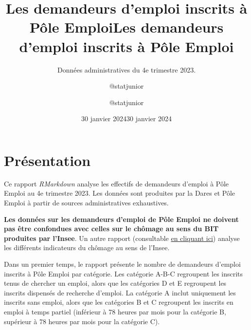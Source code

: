\documentclass[
  paper=a4,
  ,captions=tableheading
]{scrartcl}
\title{Les demandeurs d'emploi inscrits à Pôle Emploi}
\subtitle{Données administratives du 4e trimestre 2023.}
\author{@statjunior}
\date{30 janvier 2024}
\title{Les demandeurs d'emploi inscrits à Pôle Emploi}
\author{@statjunior}
\date{30 janvier 2024}
\begin{document}
\begin{titlepage}
\afterpage{\restorepagecolor}
\newcommand{\colorRule}[3][black]{\textcolor[HTML]{#1}{\rule{#2}{#3}}}
\end{titlepage}
\restoregeometry
{} 




\hypertarget{pruxe9sentation}{%
\section{Présentation}\label{pruxe9sentation}}

Ce rapport \emph{RMarkdown} analyse les effectifs de demandeurs d'emploi
à Pôle Emploi au 4e trimestre 2023. Les données sont produites par la
Dares et Pôle Emploi à partir de sources administratives exhaustives.

\textbf{Les données sur les demandeurs d'emploi de Pôle Emploi ne
doivent pas être confondues avec celles sur le chômage au sens du BIT
produites par l'Insee}. Un autre rapport (consultable
\href{https://github.com/statjunior/Statjunior/tree/main/March\%C3\%A9\%20du\%20travail\%20et\%20ch\%C3\%B4mage/Ch\%C3\%B4mage\%20BIT\%2C\%20halo\%20et\%20sous\%20emploi\%20-\%20Enqu\%C3\%AAte\%20Emploi/}{en
cliquant ici}) analyse les différents indicateurs du chômage au sens de
l'Insee.

Dans un premier temps, le rapport présente le nombre de demandeurs
d'emploi inscrits à Pôle Emploi par catégorie. Les catégorie A-B-C
regroupent les inscrits tenus de chercher un emploi, alors que les
catégories D et E regroupent les inscrits dispensés de recherche
d'emploi. La catégorie A inclut uniquement les inscrits sans emploi,
alors que les catégories B et C regroupent les inscrits en emploi à
temps partiel (inférieur à 78 heures par mois pour la catégorie B,
supérieur à 78 heures par mois pour la catégorie C).
\end{document}
